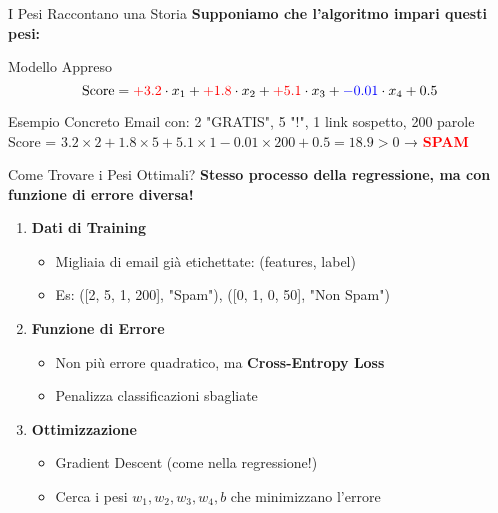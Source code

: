 \documentclass[aspectratio=169]{beamer}
\begin{document}
%
%
\begin{frame}{I Pesi Raccontano una Storia}
\textbf{Supponiamo che l'algoritmo impari questi pesi:}

\vspace{0.5cm}

\begin{block}{Modello Appreso}
$$\text{Score} = \textcolor{red}{+3.2} \cdot x_1 + \textcolor{red}{+1.8} \cdot x_2 + \textcolor{red}{+5.1} \cdot x_3 + \textcolor{blue}{-0.01} \cdot x_4 + 0.5$$
\end{block}

\vspace{0.5cm}

\begin{alertblock}{Esempio Concreto}
Email con: 2 "GRATIS", 5 "!", 1 link sospetto, 200 parole\\
Score = $3.2 \times 2 + 1.8 \times 5 + 5.1 \times 1 - 0.01 \times 200 + 0.5 = 18.9 > 0$ → \textcolor{red}{\textbf{SPAM}}
\end{alertblock}
\end{frame}
%
%
\begin{frame}{Come Trovare i Pesi Ottimali?}
\textbf{Stesso processo della regressione, ma con funzione di errore diversa!}

\vspace{0.5cm}

\begin{enumerate}
    \item \textbf{Dati di Training}
    \begin{itemize}
        \item Migliaia di email già etichettate: (features, label)
        \item Es: ([2, 5, 1, 200], "Spam"), ([0, 1, 0, 50], "Non Spam")
    \end{itemize}
    
    \vspace{0.3cm}
    
    \item \textbf{Funzione di Errore}
    \begin{itemize}
        \item Non più errore quadratico, ma \textbf{Cross-Entropy Loss}
        \item Penalizza classificazioni sbagliate
    \end{itemize}
    
    \vspace{0.3cm}
    
    \item \textbf{Ottimizzazione}
    \begin{itemize}
        \item Gradient Descent (come nella regressione!)
        \item Cerca i pesi $w_1, w_2, w_3, w_4, b$ che minimizzano l'errore
    \end{itemize}
\end{enumerate}

\vspace{0.5cm}
\end{frame}
\end{document}
